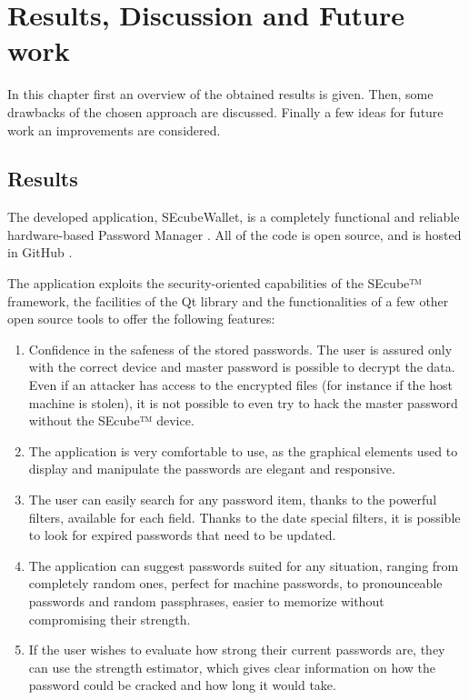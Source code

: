 \chapter{Results, Discussion and Future work} \label{chap:res}

In this chapter first an overview of the obtained results is given. Then, some drawbacks of the chosen approach are discussed. Finally a few ideas for future work an improvements are considered.

\section{Results}

The developed application, SEcubeWallet, is a completely functional and reliable hardware-based Password Manager . All of the code is open source, and is hosted in GitHub \cite{secubewallet}.

The application exploits the security-oriented capabilities of the SEcube™ framework, the facilities of the Qt library and the functionalities of a few other open source tools to offer the following features:

\begin{enumerate}
\setlength\itemsep{0pt}
\item Confidence in the safeness of the stored passwords. The user is assured only with the correct device and master password is possible to decrypt the data. Even if an attacker has access to the encrypted files (for instance if the host machine is stolen), it is not possible to even try to hack the master password without the SEcube™ device.
\item The application is very comfortable to use, as the graphical elements used to display and manipulate the passwords are elegant and responsive.
\item The user can easily search for any password item, thanks to the powerful filters, available for each field. Thanks to the date special filters, it is possible to look for expired passwords that need to be updated.
\item The application can suggest passwords suited for any situation, ranging from completely random ones, perfect for machine passwords, to pronounceable passwords and random passphrases, easier to memorize without compromising their strength.
\item If the user wishes to evaluate how strong their current passwords are, they can use the strength estimator, which gives clear information on how the password could be cracked and how long it would take.
\end{enumerate}

